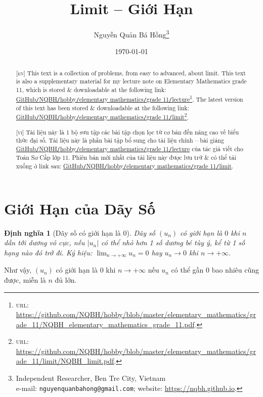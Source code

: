 \documentclass{article}
\title{Limit -- Giới Hạn}
\author{Nguyễn Quản Bá Hồng\footnote{Independent Researcher, Ben Tre City, Vietnam\\e-mail: \texttt{nguyenquanbahong@gmail.com}; website: \url{https://nqbh.github.io}.}}
\date{\today}
\numberwithin{equation}{section}
\newtheorem{dinhnghia}{Định nghĩa}[section]
\begin{document}
\maketitle
\begin{abstract}
	\textsc{[en]} This text is a collection of problems, from easy to advanced, about limit. This text is also a supplementary material for my lecture note on Elementary Mathematics grade 11, which is stored \& downloadable at the following link: \href{https://github.com/NQBH/hobby/blob/master/elementary_mathematics/grade_11/NQBH_elementary_mathematics_grade_11.pdf}{GitHub\texttt{/}NQBH\texttt{/}hobby\texttt{/}elementary mathematics\texttt{/}grade 11\texttt{/}lecture}\footnote{\textsc{url}: \url{https://github.com/NQBH/hobby/blob/master/elementary_mathematics/grade_11/NQBH_elementary_mathematics_grade_11.pdf}.}. The latest version of this text has been stored \& downloadable at the following link: \href{https://github.com/NQBH/hobby/blob/master/elementary_mathematics/grade_11/limit/NQBH_limit.pdf}{GitHub\texttt{/}NQBH\texttt{/}hobby\texttt{/}elementary mathematics\texttt{/}grade 11\texttt{/}limit}\footnote{\textsc{url}: \url{https://github.com/NQBH/hobby/blob/master/elementary_mathematics/grade_11/limit/NQBH_limit.pdf}.}.
	\vspace{2mm}
	
	\textsc{[vi]} Tài liệu này là 1 bộ sưu tập các bài tập chọn lọc từ cơ bản đến nâng cao về biểu thức đại số. Tài liệu này là phần bài tập bổ sung cho tài liệu chính -- bài giảng \href{https://github.com/NQBH/hobby/blob/master/elementary_mathematics/grade_11/NQBH_elementary_mathematics_grade_11.pdf}{GitHub\texttt{/}NQBH\texttt{/}hobby\texttt{/}elementary mathematics\texttt{/}grade 11\texttt{/}lecture} của tác giả viết cho Toán Sơ Cấp lớp 11. Phiên bản mới nhất của tài liệu này được lưu trữ \& có thể tải xuống ở link sau: \href{https://github.com/NQBH/hobby/blob/master/elementary_mathematics/grade_11/limit/NQBH_limit.pdf}{GitHub\texttt{/}NQBH\texttt{/}hobby\texttt{/}elementary mathematics\texttt{/}grade 11\texttt{/}limit}.
\end{abstract}
\tableofcontents
\newpage


\section{Giới Hạn của Dãy Số}

\begin{dinhnghia}[Dãy số có giới hạn là 0]
	Dãy số $(u_n)$ \emph{có giới hạn là $0$} khi $n$ dần tới dương vô cực, nếu $|u_n|$ có thể nhỏ hơn 1 số dương bé tùy ý, kể từ 1 số hạng nào đó trở đi. Ký hiệu: $\lim_{n\to+\infty} u_n = 0$ hay $u_n\to0$ khi $n\to+\infty$.
\end{dinhnghia}
Như vậy, $(u_n)$ có giới hạn là 0 khi $n\to+\infty$ nếu $u_n$ có thể gần 0 bao nhiêu cũng được, miễn là $n$ đủ lớn.
\end{document}

